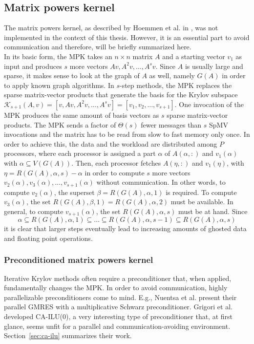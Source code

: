 \documentclass{scrartcl}
\numberwithin{equation}{section}
\begin{document}
\subsection{Matrix powers kernel}
The matrix powers kernel, as described by Hoemmen et al. in \cite{Hoemmen:2010:CKS:1970638}, was not implemented in the context of this thesis. However, it is an essential part to avoid communication and therefore, will be briefly summarized here.\\
In its basic form, the MPK takes an $n \times n$ matrix $A$ and a starting vector $v_1$ as input and produces $s$ more vectors $Av, A^2v, \ldots, A^sv$. Since $A$ is usually large and sparse, it makes sense to look at the graph of $A$ as well, namely $G(A)$ in order to apply known graph algorithms. In $s$-step methods, the MPK replaces the sparse matrix-vector products that generate the basis for the Krylov subspace $\mathcal{K}_{s + 1}(A, v) = \left[v, Av, A^2v, \ldots, A^{s}v\right] = \left[v_1, v_2, \ldots, v_{s + 1}\right]$. One invocation of the MPK produces the same amount of basis vectors as $s$ sparse matrix-vector products. The MPK sends a factor of $\Theta(s)$ fewer messages than $s$ SpMV invocations and the matrix has to be read from slow to fast memory only once.
In order to achieve this, the data and the workload are distributed among $P$ processors, where each processor is assigned a part $\alpha$ of $A(\alpha,:)$ and $v_1(\alpha)$ with $\alpha \subseteq V(G(A))$. Then, each processor fetches $A(\eta,:)$ and $v_1(\eta)$, with $\eta = R(G(A), \alpha, s) - \alpha$ in order to compute $s$ more vectors $v_2(\alpha), v_3(\alpha), \ldots, v_{s + 1}(\alpha)$ without communication. In other words, to compute $v_2(\alpha)$, the superset $\beta = R(G(A),\alpha, 1)$ is required. To compute $v_3(\alpha)$, the set $R(G(A),\beta, 1) = R(G(A),\alpha, 2)$ must be available. In general, to compute $v_{s + 1}(\alpha)$, the set $R(G(A),\alpha, s)$ must be at hand. Since
\begin{equation*}
\alpha \subseteq R(G(A),\alpha, 1) \subseteq \ldots \subseteq R(G(A),\alpha, s - 1) \subseteq R(G(A),\alpha, s)
\end{equation*} it is clear that larger steps eventually lead to increasing amounts of ghosted data and floating point operations.

\subsubsection{Preconditioned matrix powers kernel}
Iterative Krylov methods often require a preconditioner that, when applied, fundamentally changes the MPK. In order to avoid communication, highly parallelizable preconditioners come to mind. E.g., Nuentsa et al. \cite{nuen11c} present their parallel GMRES with a multiplicative Schwarz preconditioner. Grigori et al. \cite{Grigori} developed CA-ILU(0), a very interesting type of preconditioner that, at first glance, seems unfit for a parallel and communication-avoiding environment. Section~\ref{sec:ca-ilu} summarizes their work.
\end{document}
